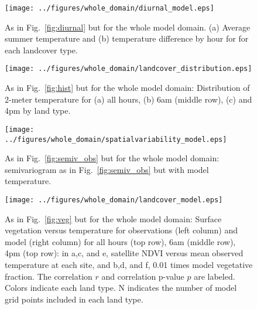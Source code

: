 \documentclass[draft,linenumbers]{agujournal}
\begin{document}

\begin{figure}[h]
\centering
\texttt{[image: ../figures/whole\_domain/diurnal\_model.eps]}
\caption{As in Fig.~\ref{fig:diurnal} but for the whole model domain. (a) Average summer temperature and (b) temperature difference by hour for for each landcover type.}%
\label{fig:diurnal_wd}
\end{figure}

\begin{figure}[h]
\centering
\texttt{[image: ../figures/whole\_domain/landcover\_distribution.eps]}
\caption{As in Fig.~\ref{fig:hist}  but for the whole model domain: Distribution of 2-meter temperature for (a) all hours, (b) 6am (middle row), (c) and 4pm by land type. }
\label{fig:hist_wd}
\end{figure}

\begin{figure}[h]
\centering
\texttt{[image: ../figures/whole\_domain/spatialvariability\_model.eps]}
\caption{As in Fig.~\ref{fig:semiv_obs} but for the whole model domain: semivariogram as in Fig.~\ref{fig:semiv_obs} but with model temperature.}
\label{fig:semiv_model_wd}
\end{figure}

\begin{figure}[h]
\centering
\texttt{[image: ../figures/whole\_domain/landcover\_model.eps]}
\caption{As in Fig.~\ref{fig:veg} but for the whole model domain:  Surface vegetation versus temperature for observations (left column) and model (right column) for all hours (top row), 6am (middle row), 4pm (top row): in a,c, and e, satellite NDVI versus mean observed temperature at each site, and b,d, and f, 0.01 times model vegetative fraction. The correlation $r$ and correlation p-value $p$ are labeled. Colors indicate each land type. N indicates the number of model grid points included in each land type.}
\label{fig:veg_wd}
\end{figure}
\end{document}
